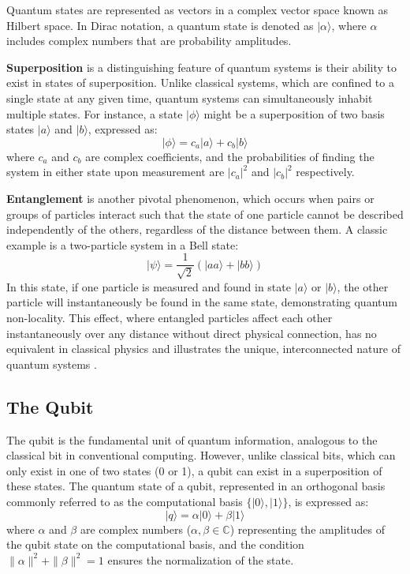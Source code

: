 Quantum states are represented as vectors in a complex vector space known as Hilbert space. In Dirac notation, a quantum state is denoted as \(|\alpha\rangle\), where \(\alpha\) includes complex numbers that are probability amplitudes.

\textbf{Superposition} is a distinguishing feature of quantum systems is their ability to exist in states of superposition. Unlike classical systems, which are confined to a single state at any given time, quantum systems can simultaneously inhabit multiple states. For instance, a state \(|\phi\rangle\) might be a superposition of two basis states \(|a\rangle\) and \(|b\rangle\), expressed as:
\begin{equation}
    |\phi\rangle = c_a |a\rangle + c_b |b\rangle
\end{equation}
where \(c_a\) and \(c_b\) are complex coefficients, and the probabilities of finding the system in either state upon measurement are \(|c_a|^2\) and \(|c_b|^2\) respectively.

\textbf{Entanglement} is another pivotal phenomenon, which occurs when pairs or groups of particles interact such that the state of one particle cannot be described independently of the others, regardless of the distance between them. A classic example is a two-particle system in a Bell state:
\begin{equation}
    |\psi\rangle = \frac{1}{\sqrt{2}} (|aa\rangle + |bb\rangle)
\end{equation}
In this state, if one particle is measured and found in state \(|a\rangle\) or \(|b\rangle\), the other particle will instantaneously be found in the same state, demonstrating quantum non-locality. This effect, where entangled particles affect each other instantaneously over any distance without direct physical connection, has no equivalent in classical physics and illustrates the unique, interconnected nature of quantum systems \cite{Griffiths2018}.
\subsection{The Qubit}

The qubit is the fundamental unit of quantum information, analogous to the classical bit in conventional computing. However, unlike classical bits, which can only exist in one of two states (0 or 1), a qubit can exist in a superposition of these states. The quantum state of a qubit, represented in an orthogonal basis commonly referred to as the computational basis \(\{|0\rangle, |1\rangle\}\), is expressed as:
\begin{equation}
    |q\rangle = \alpha|0\rangle + \beta|1\rangle
\end{equation}
where \(\alpha\) and \(\beta\) are complex numbers (\(\alpha, \beta \in \mathbb{C}\)) representing the amplitudes of the qubit state on the computational basis, and the condition \(\|\alpha\|^2 + \|\beta\|^2 = 1\) ensures the normalization of the state.

